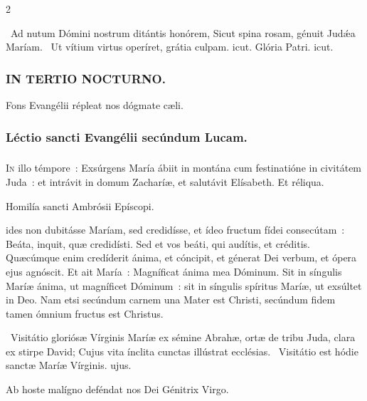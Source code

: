 \documentclass[9pt,twoside]{extarticle}
\begin{document}
\begin{multicols}{2}
\begin{tightlist}{}
\item {}~Ad nutum Dómini nostrum ditántis honórem, \textred{*} Sicut spina rosam, génuit Judǽa Maríam. ~Ut vítium virtus operíret, grátia culpam. icut. Glória Patri. icut.
\end{tightlist}

\subsubsection*{\center \textsc{IN TERTIO NOCTURNO.}}
\begin{tightlist}{}
\item {} Fons Evangélii répleat nos dógmate cæli.
\end{tightlist}

\subsubsection*{\center Léctio sancti Evangélii secúndum Lucam.}
\subsubsection*{\center {}}
\lettrine{I}n illo témpore~: Exsúrgens María ábiit in montána cum festinatióne in civitátem Juda~: et intrávit in domum Zacharíæ, et salutávit Elísabeth. Et réliqua.

\begin{center}Homilía sancti Ambrósii Epíscopi.\end{center}
ides non dubitásse Maríam, sed credidísse, et ídeo fructum fídei consecútam~: Beáta, inquit, quæ credidísti. Sed et vos beáti, qui audítis, et créditis. Quæcúmque enim credíderit ánima, et cóncipit, et génerat Dei verbum, et ópera ejus agnóscit. Et ait María~: Magníficat ánima mea Dóminum. Sit in síngulis Maríæ ánima, ut magníficet Dóminum~: sit in síngulis spíritus Maríæ, ut exsúltet in Deo. Nam etsi secúndum carnem una Mater est Christi, secúndum fidem tamen ómnium fructus est Christus.

\begin{tightlist}{}
\item {}~Visitátio gloriósæ Vírginis Maríæ ex sémine Abrahæ, ortæ de tribu Juda, clara ex stirpe David; \textred{*} Cujus vita ínclita cunctas illústrat ecclésias. ~Visitátio est hódie sanctæ Maríæ Vírginis. ujus.
\item {} Ab hoste malígno deféndat nos Dei Génitrix Virgo.
\end{tightlist}


\end{multicols}
\end{document}
